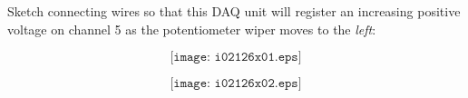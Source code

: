 

Sketch connecting wires so that this DAQ unit will register an increasing positive voltage on channel 5 as the potentiometer wiper moves to the {\it left}:

$$\texttt{[image: i02126x01.eps]}$$







$$\texttt{[image: i02126x02.eps]}$$











